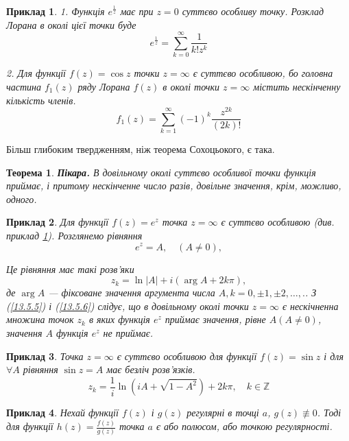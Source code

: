 \documentclass[fontsize=14pt]{scrartcl}
\newtheorem{exm}{Приклад}[section]
\theoremstyle{theorem}
\newtheorem{thm}{Теорема}[section]
\theoremstyle{proof}
\begin{document}
\begin{exm}\label{exm.13.5.1}
  1. Функція $e^{\frac{1}{z}}$ має при $z=0$ суттєво особливу точку. Розклад Лорана в околі цієї точки буде
  $$e^{\frac{1}{z}}=\sum_{k=0}^{\infty}\frac{1}{k!z^k}$$

  2. Для функції $f(z)=\cos z$ точки $z=\infty$ є суттєво особливою, бо головна частина $f_1(z)$ ряду Лорана $f(z)$ в околі точки $z=\infty$ містить нескінченну кількість членів.
  $$f_1(z)=\sum_{k=1}^{\infty}(-1)^k\frac{z^{2k}}{(2k)!}$$
\end{exm}

Більш глибоким твердженням, ніж теорема Сохоцьокого, є така.
\begin{thm}
  \textbf{Пікара.} В довільному околі суттєво особливої точки функція приймає, і притому нескінченне число разів, довільне значення, крім, можливо, одного.
\end{thm}

\begin{exm}\label{exm.13.5.2}
  Для функції $f(z)=e^z$ точка $z=\infty$ є суттєво особливою (див. приклад \ref{exm.13.5.1}). Розглянемо рівняння
  \begin{equation}\label{13.5.5}
    e^z=A, \quad(A\neq 0),
  \end{equation}

  Це рівняння має такі розв'яки
  \begin{equation}\label{13.5.6}
    z_k=\ln|A|+i(\arg A+2k\pi),
  \end{equation}
  де $\arg A$ --- фіксоване значення аргумента числа $A, k=0, \pm 1,\pm 2, \dots,.$. З (\ref{13.5.5}) і (\ref{13.5.6}) слідує, що в довільному околі точки $z=\infty$ є нескічненна множина точок $z_k$ в яких функція $e^z$ приймає значення, рівне $A(A\neq0)$, значення $A$ функція $e^z$ не приймає.
\end{exm}

\begin{exm}
  Точка $z=\infty$ є суттєво особливою для функції $f(z)=\sin z$ і для $\forall A$ рівняння $\sin z = A$ має безліч розв'язків.
  $$z_k=\frac{1}{i}\ln(iA+\sqrt{1-A^2})+2k\pi, \quad k \in \mathbb{Z}$$
\end{exm}

\begin{exm}
  Нехай функції $f(z)$ і $g(z)$ регулярні в точці $a$, $g(z) \not\equiv 0$. Тоді для функції $h(z)=\frac{f(z)}{g(z)}$ точка $a$ є або полюсом, або точкою регулярності.
\end{exm}
\end{document}
